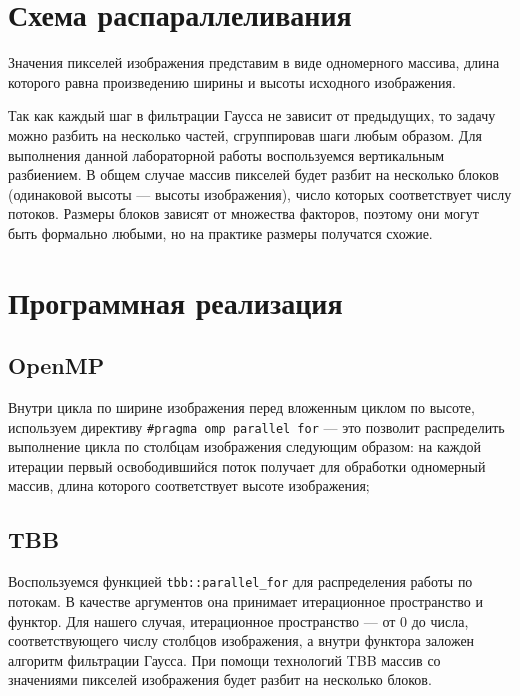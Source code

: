 \documentclass{report}
\begin{document}
	\newpage


	\section*{Схема распараллеливания}

	\par Значения пикселей изображения представим в виде одномерного массива, длина которого равна произведению ширины и высоты исходного изображения.
	\par Так как каждый шаг в фильтрации Гаусса не зависит от предыдущих, то задачу можно разбить на несколько частей, сгруппировав шаги любым образом. Для выполнения данной лабораторной работы воспользуемся вертикальным разбиением. В общем случае массив пикселей будет разбит на несколько блоков (одинаковой высоты — высоты изображения), число которых соответствует числу потоков. Размеры блоков зависят от множества факторов, поэтому они могут быть формально любыми, но на практике размеры получатся схожие.
	\newpage


	\section*{Программная реализация}

	\subsection*{OpenMP}
	\par Внутри цикла по ширине изображения перед вложенным циклом по высоте, используем директиву \verb|#pragma omp parallel for| — это позволит распределить выполнение цикла по столбцам изображения следующим образом: на каждой итерации первый освободившийся поток получает для обработки одномерный массив, длина которого соответствует высоте изображения;

	\subsection*{TBB}
	\par Воспользуемся функцией \verb|tbb::parallel_for| для распределения работы по потокам. В качестве аргументов она принимает итерационное пространство и функтор. Для нашего случая, итерационное пространство — от 0 до числа, соответствующего числу столбцов изображения, а внутри функтора заложен алгоритм фильтрации Гаусса. При помощи технологий TBB массив со значениями пикселей изображения будет разбит на несколько блоков.
\end{document}

